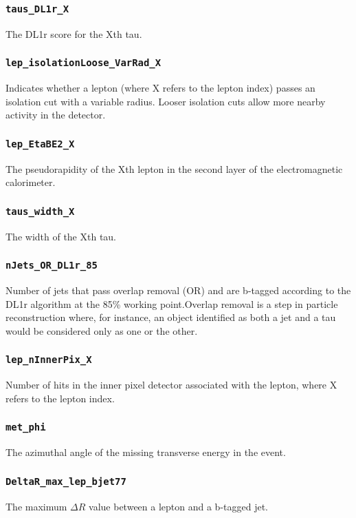\subsubsection{\texttt{taus\_DL1r\_X}} The DL1r score for the Xth tau.

\subsubsection{\texttt{lep\_isolationLoose\_VarRad\_X}} Indicates whether a lepton (where X refers to the lepton index)
passes an isolation cut with a variable radius. Looser isolation cuts allow more nearby activity in the detector.

\subsubsection{\texttt{lep\_EtaBE2\_X}} The pseudorapidity of the Xth lepton in the second layer of the electromagnetic
calorimeter.

\subsubsection{\texttt{taus\_width\_X}} The width of the Xth tau.

\subsubsection{\texttt{nJets\_OR\_DL1r\_85}} Number of jets that pass overlap removal (OR) and are b-tagged according to the
DL1r algorithm at the 85\% working point.Overlap removal is a step in particle reconstruction where, for instance, an
object identified as both a jet and a tau would be considered only as one or the other.

\subsubsection{\texttt{lep\_nInnerPix\_X}} Number of hits in the inner pixel detector associated with the lepton, where X
refers to the lepton index.

\subsubsection{\texttt{met\_phi}} The azimuthal angle of the missing transverse energy in the event.

\subsubsection{\texttt{DeltaR\_max\_lep\_bjet77}} The maximum $\Delta R$ value between a lepton and a b-tagged jet.


